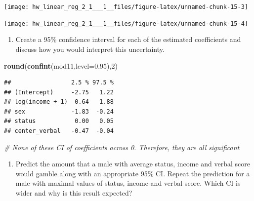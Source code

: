 \documentclass[]{article}
\newenvironment{Shaded}{\begin{snugshade}}{\end{snugshade}}
\newcommand{\KeywordTok}[1]{\textcolor[rgb]{0.13,0.29,0.53}{\textbf{#1}}}
\newcommand{\DataTypeTok}[1]{\textcolor[rgb]{0.13,0.29,0.53}{#1}}
\newcommand{\DecValTok}[1]{\textcolor[rgb]{0.00,0.00,0.81}{#1}}
\newcommand{\FloatTok}[1]{\textcolor[rgb]{0.00,0.00,0.81}{#1}}
\newcommand{\CommentTok}[1]{\textcolor[rgb]{0.56,0.35,0.01}{\textit{#1}}}
\newcommand{\NormalTok}[1]{#1}
\providecommand{\tightlist}{%
  \setlength{\itemsep}{0pt}\setlength{\parskip}{0pt}}
\begin{document}
\begin{center}\texttt{[image: hw\_linear\_reg\_2\_1\_\_\_1\_\_files/figure-latex/unnamed-chunk-15-3]} \end{center}

\begin{center}\texttt{[image: hw\_linear\_reg\_2\_1\_\_\_1\_\_files/figure-latex/unnamed-chunk-15-4]} \end{center}

\begin{enumerate}
\def\labelenumi{\arabic{enumi}.}
\setcounter{enumi}{1}
\tightlist
\item
  Create a 95\% confidence interval for each of the estimated
  coefficients and discuss how you would interpret this uncertainty.
\end{enumerate}

\begin{Shaded}
\begin{Highlighting}[]
\KeywordTok{round}\NormalTok{(}\KeywordTok{confint}\NormalTok{(mod11,}\DataTypeTok{level=}\FloatTok{0.95}\NormalTok{),}\DecValTok{2}\NormalTok{) }
\end{Highlighting}
\end{Shaded}

\begin{verbatim}
##                 2.5 % 97.5 %
## (Intercept)     -2.75   1.22
## log(income + 1)  0.64   1.88
## sex             -1.83  -0.24
## status           0.00   0.05
## center_verbal   -0.47  -0.04
\end{verbatim}

\begin{Shaded}
\begin{Highlighting}[]
\CommentTok{# None of these CI of coefficients across 0. Therefore, they are all significant}
\end{Highlighting}
\end{Shaded}

\begin{enumerate}
\def\labelenumi{\arabic{enumi}.}
\setcounter{enumi}{2}
\tightlist
\item
  Predict the amount that a male with average status, income and verbal
  score would gamble along with an appropriate 95\% CI. Repeat the
  prediction for a male with maximal values of status, income and verbal
  score. Which CI is wider and why is this result expected?
\end{enumerate}
\end{document}
